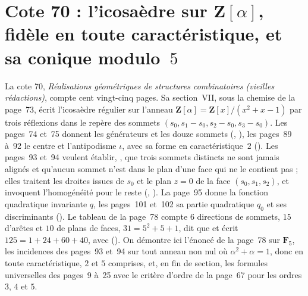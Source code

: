 \section[Cote 70 : l'icosaèdre en coordonnées universelles, fidèle en toute caractéristique, et sa conique modulo 5]{Cote 70 : l'icosaèdre sur $\mathbf Z[\alpha]$, fidèle en toute caractéristique, et sa conique modulo~$5$\protect{}}\label{sec:70}

La cote 70, \emph{Réalisations géométriques de structures combinatoires (vieilles rédactions)}, compte cent vingt-cinq pages. Sa section~VII, sous la chemise de la page~73, écrit l'icosaèdre régulier sur l'anneau $\mathbf Z[\alpha] = \mathbf Z[x]/(x^2 + x - 1)$ par trois réflexions dans le repère des sommets $(s_0, s_1 - s_0, s_2 - s_0, s_3 - s_0)$. Les pages~74 et~75 donnent les générateurs et les douze sommets (, ), les pages~89 à~92 le centre et l'antipodisme $\iota$, avec sa forme en caractéristique~$2$ (). Les pages~93 et~94 veulent établir, , que trois sommets distincts ne sont jamais alignés et qu'aucun sommet n'est dans le plan d'une face qui ne le contient pas ; elles traitent les droites issues de $s_0$ et le plan $z = 0$ de la face $(s_0, s_1, s_2)$, et invoquent l'homogénéité pour le reste (, ). La page~95 donne la fonction quadratique invariante $q$, les pages~101 et~102 sa partie quadratique $q_0$ et ses discriminants (). Le tableau  de la page~78 compte $6$ directions de sommets, $15$ d'arêtes et $10$ de plans de faces, $31 = 5^2 + 5 + 1$, dit que  et écrit $125 = 1 + 24 + 60 + 40$, avec  (). On démontre ici l'énoncé de la page~78 sur $\mathbf F_5$, les incidences des pages~93 et~94 sur tout anneau non nul où $\alpha^2 + \alpha = 1$, donc en toute caractéristique, $2$ et $5$ comprises, et, en fin de section, les formules universelles des pages~9 à~25 avec le critère d'ordre de la page~67 pour les ordres $3$, $4$ et $5$.

